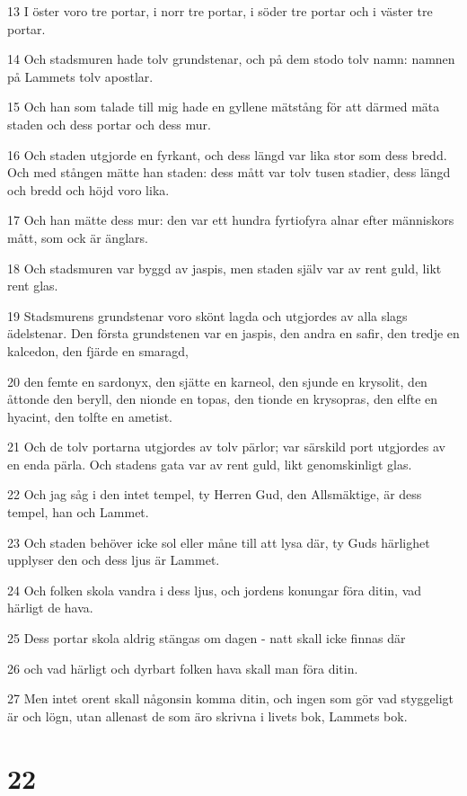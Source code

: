 \par 13 I öster voro tre portar, i norr tre portar, i söder tre portar och i väster tre portar.
\par 14 Och stadsmuren hade tolv grundstenar, och på dem stodo tolv namn: namnen på Lammets tolv apostlar.
\par 15 Och han som talade till mig hade en gyllene mätstång för att därmed mäta staden och dess portar och dess mur.
\par 16 Och staden utgjorde en fyrkant, och dess längd var lika stor som dess bredd. Och med stången mätte han staden: dess mått var tolv tusen stadier, dess längd och bredd och höjd voro lika.
\par 17 Och han mätte dess mur: den var ett hundra fyrtiofyra alnar efter människors mått, som ock är änglars.
\par 18 Och stadsmuren var byggd av jaspis, men staden själv var av rent guld, likt rent glas.
\par 19 Stadsmurens grundstenar voro skönt lagda och utgjordes av alla slags ädelstenar. Den första grundstenen var en jaspis, den andra en safir, den tredje en kalcedon, den fjärde en smaragd,
\par 20 den femte en sardonyx, den sjätte en karneol, den sjunde en krysolit, den åttonde den beryll, den nionde en topas, den tionde en krysopras, den elfte en hyacint, den tolfte en ametist.
\par 21 Och de tolv portarna utgjordes av tolv pärlor; var särskild port utgjordes av en enda pärla. Och stadens gata var av rent guld, likt genomskinligt glas.
\par 22 Och jag såg i den intet tempel, ty Herren Gud, den Allsmäktige, är dess tempel, han och Lammet.
\par 23 Och staden behöver icke sol eller måne till att lysa där, ty Guds härlighet upplyser den och dess ljus är Lammet.
\par 24 Och folken skola vandra i dess ljus, och jordens konungar föra ditin, vad härligt de hava.
\par 25 Dess portar skola aldrig stängas om dagen - natt skall icke finnas där
\par 26 och vad härligt och dyrbart folken hava skall man föra ditin.
\par 27 Men intet orent skall någonsin komma ditin, och ingen som gör vad styggeligt är och lögn, utan allenast de som äro skrivna i livets bok, Lammets bok.

\chapter{22}

